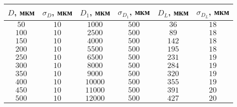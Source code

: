 \begin{tabular}{| c | c | c | c | c | c |}
\hline
$D$, мкм & $\sigma_D$, мкм & $D_1$, мкм & $\sigma_{D_1}$, мкм & $D_L$, мкм & $\sigma_{D_L}$, мкм\\
\hline
$50$ & $10$ & $1000$ & $500$ & $36$ & $18$\\
\hline
$100$ & $10$ & $2500$ & $500$ & $89$ & $18$\\
\hline
$150$ & $10$ & $4000$ & $500$ & $142$ & $18$\\
\hline
$200$ & $10$ & $5500$ & $500$ & $195$ & $18$\\
\hline
$250$ & $10$ & $6500$ & $500$ & $231$ & $19$\\
\hline
$300$ & $10$ & $8000$ & $500$ & $284$ & $19$\\
\hline
$350$ & $10$ & $9000$ & $500$ & $320$ & $19$\\
\hline
$400$ & $10$ & $10000$ & $500$ & $355$ & $19$\\
\hline
$450$ & $10$ & $11000$ & $500$ & $391$ & $20$\\
\hline
$500$ & $10$ & $12000$ & $500$ & $427$ & $20$\\
\hline
\end{tabular}
